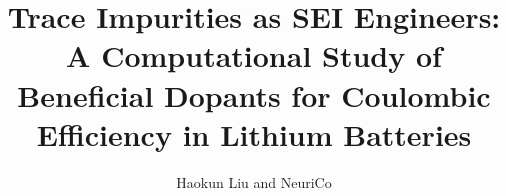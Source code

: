 \documentclass{article}
\title{Trace Impurities as SEI Engineers: A Computational Study of\\Beneficial Dopants for Coulombic Efficiency in Lithium Batteries}
\author{Haokun Liu and NeuriCo}
\begin{document}
\maketitle

\begin{abstract}

\end{abstract}









\end{document}
